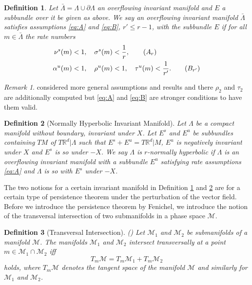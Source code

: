 \documentclass[a4paper,11pt]{article}
\newtheorem{definition}{Definition}[section]
\theoremstyle{remark}
\newtheorem{remark}{Remark}[section]
\begin{document}
\begin{definition} \label{def:over}
Let $\bar{\Lambda}=\Lambda \cup \partial\Lambda$  an overflowing invariant manifold and $E$ a subbundle over it be given as above. We say an overflowing invariant manifold $\bar{\Lambda}$ satisfies assumptions \eqref{eq:A} and \eqref{eq:B}, $r'\le r-1$, with the subbundle $E$ if for all $m\in \bar{\Lambda}$ the rate numbers
\begin{align}
\nu^s(m)&<1, \quad \sigma^s(m)<\frac{1}{r}, \label{eq:A}\tag{$A_r$} \\
\alpha^u(m)&<1, \quad \rho^u(m)<1, \quad \tau^u(m)<\frac{1}{r'}. \label{eq:B}\tag{$B_{r'}$}
\end{align}
\end{definition}
\begin{remark}
 \cite{fenichel_asymptotic_1977} considered more general assumptions and results and there $\rho_2$ and $\tau_2$ are additionally computed but \eqref{eq:A} and \eqref{eq:B} are stronger conditions to have them valid. %
\end{remark}
\begin{definition}[Normally Hyperbolic Invariant Manifold] \label{def:nhim}
 Let $\Lambda$ be a compact manifold without boundary, invariant under $X$. Let $E^s$ and $E^u$ be subbundles containing $TM$ of $T \mathbb{R}^d|\Lambda$ such that $E^s + E^u = T \mathbb{R}^d|M$, $E^u$ is negatively invariant under $X$ and $E^s$ is so under $-X$. We say $\Lambda$ is $r$-normally hyperbolic if $\Lambda$ is an overflowing invariant manifold with a subbundle $E^u$ satisfying rate assumptions \eqref{eq:A} and $\Lambda$ is so with $E^s$ under $-X$. 
\end{definition}
The two notions for a certain invariant manifold in Definition \ref{def:over} and \ref{def:nhim} are for a certain type of persistence theorem under the perturbation of the vector field. Before we introduce the persistence theorem by Fenichel, we introduce the notion of the transversal intersection of two submanifolds in a phase space $\mathcal{M}$.
\begin{definition}[Transversal Intersection]  (\cite[Definition 3.1]{Sz1991})
 Let ${\mathcal{M}}_1$ and ${\mathcal{M}}_2$ be submanifolds of a manifold ${\mathcal{M}}$. The manifolds ${\mathcal{M}}_1$ and ${\mathcal{M}}_2$ intersect transversally at a point $m\in{\mathcal{M}}_1\cap {\mathcal{M}}_2$ iff 
 $$T_m{\mathcal{M}} =  T_m{\mathcal{M}}_1+T_m{\mathcal{M}}_2$$
 holds, where $T_m\mathcal{M}$ denotes the tangent space of the manifold $\mathcal{M}$ and similarly for $\mathcal{M}_1$ and $\mathcal{M}_2$.
\end{definition}
\end{document}
